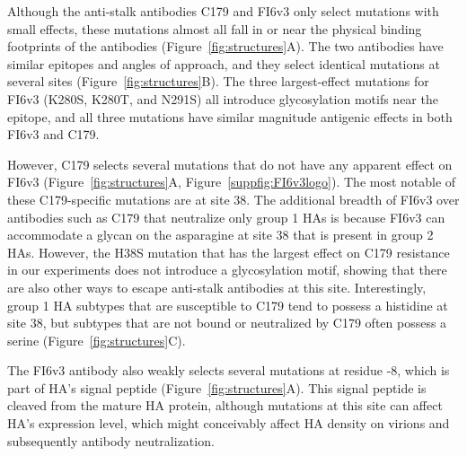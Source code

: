 \documentclass[11pt]{article}
\begin{document}
Although the anti-stalk antibodies C179 and FI6v3 only select mutations with small effects, these mutations almost all fall in or near the physical binding footprints of the antibodies (Figure~\ref{fig:structures}A).
The two antibodies have similar epitopes and angles of approach\cite{dreyfus2013structure}, and they select identical mutations at several sites (Figure~\ref{fig:structures}B). 
The three largest-effect mutations for FI6v3 (K280S, K280T, and N291S) all introduce glycosylation motifs near the epitope, and all three mutations have similar magnitude antigenic effects in both FI6v3 and C179.

However, C179 selects several mutations that do not have any apparent effect on FI6v3 (Figure~\ref{fig:structures}A, Figure~\ref{suppfig:FI6v3logo}).
The most notable of these C179-specific mutations are at site 38.
The additional breadth of FI6v3 over antibodies such as C179 that neutralize only group 1 HAs is because FI6v3 can accommodate a glycan on the asparagine at site 38 that is present in group 2 HAs\cite{corti2011neutralizing,sui2009structural,ekiert2009antibody}. 
However, the H38S mutation that has the largest effect on C179 resistance in our experiments does not introduce a glycosylation motif, showing that there are also other ways to escape anti-stalk antibodies at this site.
Interestingly, group 1 HA subtypes that are susceptible to C179 tend to possess a histidine at site 38, but subtypes that are not bound or neutralized by C179 often possess a serine (Figure~\ref{fig:structures}C). 

The FI6v3 antibody also weakly selects several mutations at residue -8, which is part of HA's signal peptide (Figure~\ref{fig:structures}A). 
This signal peptide is cleaved from the mature HA protein\cite{daniels2003n,burke2014recommended}, although mutations at this site can affect HA's expression level\cite{nordholm2017translational}, which might conceivably affect HA density on virions and subsequently antibody neutralization\cite{corti2011neutralizing,joyce2016vaccine}.
\end{document}

